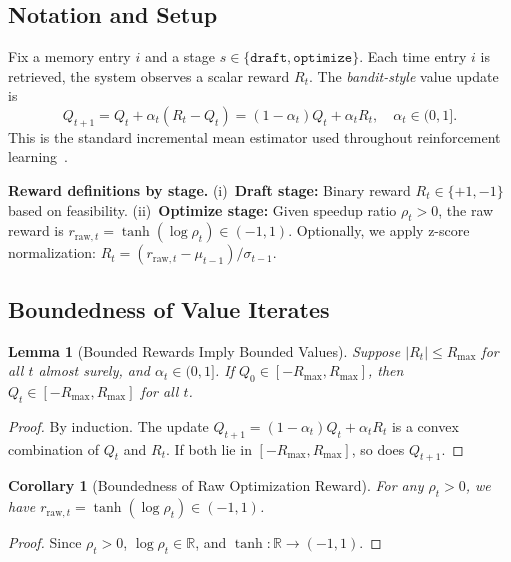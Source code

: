 \documentclass{article} %
\newtheorem{lemma}[theorem]{Lemma}
\newtheorem{corollary}[theorem]{Corollary}
\theoremstyle{definition}
\theoremstyle{remark}
\begin{document}
  \subsection{Notation and Setup}

  Fix a memory entry $i$ and a stage $s \in \{\texttt{draft}, \texttt{optimize}\}$. Each time entry $i$ is retrieved, the system observes a scalar reward $R_t$. The \emph{bandit-style} value update is
  \begin{equation}
  Q_{t+1} = Q_t + \alpha_t (R_t - Q_t) = (1 - \alpha_t) Q_t + \alpha_t R_t, \quad \alpha_t \in (0, 1].
  \label{eq:app_bandit_update}
  \end{equation}
  This is the standard incremental mean estimator used throughout reinforcement learning~\citep{sutton2018reinforcement}.

  \textbf{Reward definitions by stage.}
  (i)~\textbf{Draft stage:} Binary reward $R_t \in \{+1, -1\}$ based on feasibility.
  (ii)~\textbf{Optimize stage:} Given speedup ratio $\rho_t > 0$, the raw reward is $r_{\text{raw},t} = \tanh(\log \rho_t) \in (-1, 1)$. Optionally, we apply z-score normalization: $R_t = (r_{\text{raw},t} - \mu_{t-1}) / \sigma_{t-1}$.

  \subsection{Boundedness of Value Iterates}

  \begin{lemma}[Bounded Rewards Imply Bounded Values]
  \label{lem:boundedness}
  Suppose $|R_t| \le R_{\max}$ for all $t$ almost surely, and $\alpha_t \in (0, 1]$. If $Q_0 \in [-R_{\max}, R_{\max}]$, then $Q_t \in [-R_{\max}, R_{\max}]$ for all $t$.
  \end{lemma}

  \begin{proof}
  By induction. The update $Q_{t+1} = (1 - \alpha_t) Q_t + \alpha_t R_t$ is a convex combination of $Q_t$ and $R_t$. If both lie in $[-R_{\max}, R_{\max}]$, so does $Q_{t+1}$.
  \end{proof}

  \begin{corollary}[Boundedness of Raw Optimization Reward]
  \label{cor:tanh_bounded}
  For any $\rho_t > 0$, we have $r_{\text{raw},t} = \tanh(\log \rho_t) \in (-1, 1)$.
  \end{corollary}

  \begin{proof}
  Since $\rho_t > 0$, $\log \rho_t \in \mathbb{R}$, and $\tanh: \mathbb{R} \to (-1, 1)$.
  \end{proof}
\end{document}
